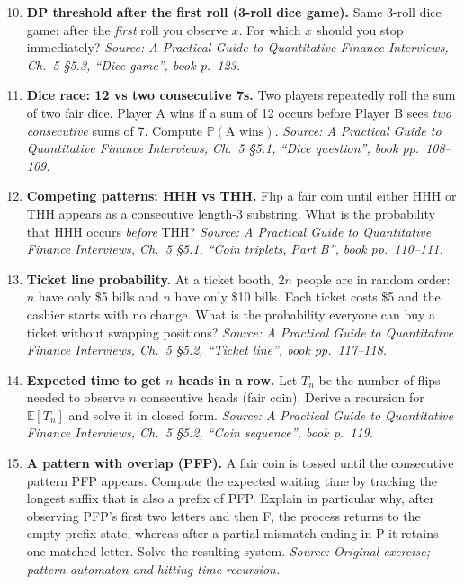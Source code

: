 \documentclass[11pt]{article}
\begin{document}
\begin{enumerate}[leftmargin=*, itemsep=0.9em]
\setcounter{enumi}{9}

\item \textbf{DP threshold after the first roll (3-roll dice game).}  
Same 3-roll dice game: after the \emph{first} roll you observe $x$. For which $x$ should you stop immediately?  
\textit{Source: A Practical Guide to Quantitative Finance Interviews, Ch.\ 5 \S5.3, ``Dice game'', book p.\ 123.}

\item \textbf{Dice race: 12 vs two consecutive 7s.}  
Two players repeatedly roll the sum of two fair dice. Player A wins if a sum of 12 occurs before Player B sees \emph{two consecutive} sums of 7. Compute $\mathbb{P}(\text{A wins})$.  
\textit{Source: A Practical Guide to Quantitative Finance Interviews, Ch.\ 5 \S5.1, ``Dice question'', book pp.\ 108--109.}

\item \textbf{Competing patterns: HHH vs THH.}  
Flip a fair coin until either HHH or THH appears as a consecutive length-3 substring. What is the probability that HHH occurs \emph{before} THH?  
\textit{Source: A Practical Guide to Quantitative Finance Interviews, Ch.\ 5 \S5.1, ``Coin triplets, Part B'', book pp.\ 110--111.}

\item \textbf{Ticket line probability.}  
At a ticket booth, $2n$ people are in random order: $n$ have only \$5 bills and $n$ have only \$10 bills. Each ticket costs \$5 and the cashier starts with no change. What is the probability everyone can buy a ticket without swapping positions?  
\textit{Source: A Practical Guide to Quantitative Finance Interviews, Ch.\ 5 \S5.2, ``Ticket line'', book pp.\ 117--118.}

\item \textbf{Expected time to get $n$ heads in a row.}  
Let $T_n$ be the number of flips needed to observe $n$ consecutive heads (fair coin). Derive a recursion for $\mathbb{E}[T_n]$ and solve it in closed form.  
\textit{Source: A Practical Guide to Quantitative Finance Interviews, Ch.\ 5 \S5.2, ``Coin sequence'', book p.\ 119.}

\item \textbf{A pattern with overlap (PFP).}  
A fair coin is tossed until the consecutive pattern PFP appears. Compute the expected waiting time by tracking the longest suffix that is also a prefix of PFP. Explain in particular why, after observing PFP's first two letters and then F, the process returns to the empty-prefix state, whereas after a partial mismatch ending in P it retains one matched letter. Solve the resulting system.
\textit{Source: Original exercise; pattern automaton and hitting-time recursion.}


\end{enumerate}
\end{document}

